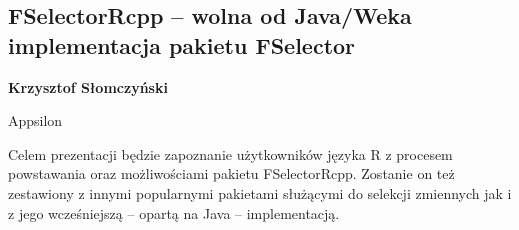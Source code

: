 \documentclass[\main/boa.tex]{subfiles}
\begin{document}
\subsection{FSelectorRcpp – wolna od Java/Weka implementacja pakietu FSelector}

\begin{minipage}{0.915\textwidth}
	\centering
  {\bf {} Krzysztof Słomczyński}
\end{minipage}



\begin{affiliations}
\begin{minipage}{0.915\textwidth}
\centering
Appsilon \\[-2pt]
\end{minipage}
\end{affiliations}

\vskip 0.3cm

Celem prezentacji będzie zapoznanie użytkowników języka R z procesem powstawania oraz możliwościami pakietu FSelectorRcpp. Zostanie on też zestawiony z innymi popularnymi pakietami służącymi do selekcji zmiennych jak i z jego wcześniejszą – opartą na Java – implementacją. 
\end{document}
